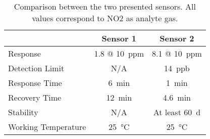 \begin{table}[]
\centering
\begin{tabular}{lcc}
                    & Sensor 1 & Sensor 2 \\
                    \hline \hline
Response &   1.8 @ \SI{10}{ppm}        &   8.1 @ \SI{10}{ppm}       \\
\hline
Detection Limit    &    N/A      &   \SI{14}{ppb}       \\
\hline
Response Time       &      \SI{6}{\minute}   &  \SI{1}{\minute}        \\
\hline
Recovery Time       &      \SI{12}{\minute}   &  \SI{4.6}{\minute}        \\
\hline
Stability           &      N/A    &   At least \SI{60}{\day}       \\
\hline
Working Temperature &      \SI{25}{\celsius}    &  \SI{25}{\celsius} \\
\hline \hline
\end{tabular}
\caption{Comparison between the two presented sensors. All values correspond to NO2 as analyte gas.}
\label{tab:comparison}
\end{table}